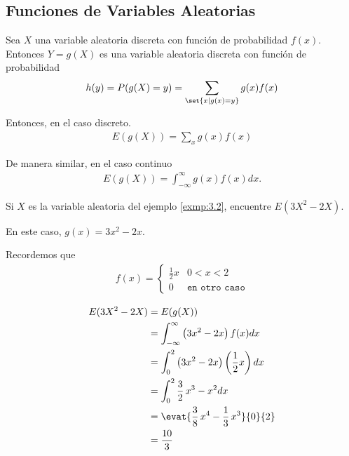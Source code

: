 \subsection{Funciones de Variables Aleatorias}

 Sea $X$ una variable aleatoria discreta con función de probabilidad $f(x).$ Entonces $Y=g(X)$ es una variable aleatoria discreta con función de probabilidad
 \begin{align}
  h(y)=P(g(X)=y)=\sum_{\set{x|g(x)=y}}g(x)f(x)
 \end{align}



 Entonces, en el caso discreto.
 \begin{align}
 \label{eq:0.3.5}
  E\left( g(X) \right)=
  \sum_{x}g(x)f(x)
 \end{align}

 De manera similar, en el caso continuo
 \begin{align}
  \label{eq:0.3.6}
  E\left( g(X) \right)=\int_{-\infty}^{\infty}
  g(x)f(x)dx.
 \end{align}




 \begin{ejemplo}
  \label{exmp:0.3.3}
  Si $X$ es la variable aleatoria del ejemplo \ref{exmp:3.2}, encuentre $E\left( 3X^{2}-2X \right).$
 \end{ejemplo}


{}
En este caso, $g(x)=3x^2-2x.$



Recordemos que
  \begin{align}
   f(x)=
   \begin{cases}
    \frac{1}{2}x & 0<x<2 \\
    0 & \texttt{en otro caso}
   \end{cases}
  \end{align}



\begin{align}
 E(3X^2-2X) &= E(g(X)) \\
  &= \displaystyle \int_{-\infty}^{\infty} \left( 3x^2-2x \right)f(x)dx\\
  &= \displaystyle \int_{0}^{2}\left( 3x^2-2x \right)\left( \dfrac{1}{2}x \right)dx \\
  &= \displaystyle \int_{0}^{2} \frac{3}{2} \, x^{3} - x^{2} dx
 \\  &= \displaystyle \evat{\frac{3}{8} \, x^{4} - \frac{1}{3} \, x^{3}
}{0}{2}
\\  &= \displaystyle
\frac{10}{3}
\end{align}


